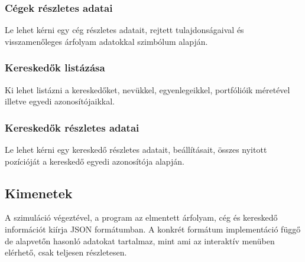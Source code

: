 \documentclass[./terv.tex]{subfiles}
\begin{document}
    \subsubsection{Cégek részletes adatai}
    Le lehet kérni egy cég részletes adatait, rejtett tulajdonságaival és visszamenőleges árfolyam adatokkal szimbólum alapján.

    \subsubsection{Kereskedők listázása}
    Ki lehet listázni a kereskedőket, nevükkel, egyenlegeikkel, portfólióik méretével illetve egyedi azonosítójaikkal.

    \subsubsection{Kereskedők részletes adatai}
    Le lehet kérni egy kereskedő részletes adatait, beállításait, összes nyitott pozícióját a kereskedő egyedi azonosítója alapján.


    \subsection{Kimenetek}
    A szimuláció végeztével, a program az elmentett árfolyam, cég és kereskedő információt kiírja JSON formátumban.
    A konkrét formátum implementáció függő de alapvetőn hasonló adatokat tartalmaz, mint ami az interaktív menüben elérhető, csak teljesen részletesen.
\end{document}
